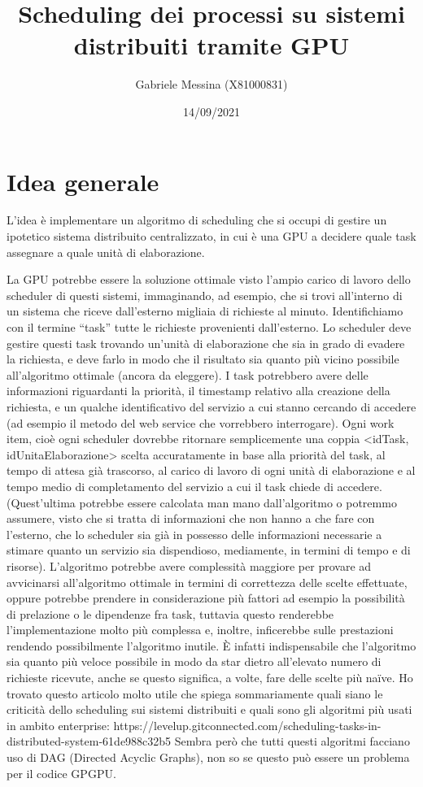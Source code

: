 \documentclass{article}
\title{Scheduling dei processi su sistemi distribuiti tramite GPU}
\author{Gabriele Messina (X81000831)}
\date{14/09/2021}
\begin{document}
    \maketitle

    \section{Idea generale}
        L'idea è implementare un algoritmo di scheduling che si occupi di gestire un ipotetico sistema distribuito centralizzato, in cui è una GPU a decidere quale task assegnare a quale unità di elaborazione.

        La GPU potrebbe essere la soluzione ottimale visto l'ampio carico di lavoro dello scheduler di questi sistemi, immaginando, ad esempio, che si trovi all'interno di un sistema che riceve dall'esterno migliaia di richieste al minuto.
        Identifichiamo con il termine “task” tutte le richieste provenienti dall'esterno.
        Lo scheduler deve gestire questi task trovando un'unità di elaborazione che sia in grado di evadere la richiesta, e deve farlo in modo che il risultato sia quanto più vicino possibile all'algoritmo ottimale (ancora da eleggere).
        I task potrebbero avere delle informazioni riguardanti la priorità, il timestamp relativo alla creazione della richiesta, e un qualche identificativo del servizio a cui stanno cercando di accedere (ad esempio il metodo del web service che vorrebbero interrogare).
        Ogni work item, cioè ogni scheduler dovrebbe ritornare semplicemente una coppia <idTask, idUnitaElaborazione> scelta accuratamente in base alla priorità del task, al tempo di attesa già trascorso, al carico di lavoro di ogni unità di elaborazione e al tempo medio di completamento del servizio a cui il task chiede di accedere. (Quest'ultima potrebbe essere calcolata man mano dall'algoritmo o potremmo assumere, visto che si tratta di informazioni che non hanno a che fare con l'esterno, che lo scheduler sia già in possesso delle informazioni necessarie a stimare quanto un servizio sia dispendioso, mediamente, in termini di tempo e di risorse).
        L'algoritmo potrebbe avere complessità maggiore per provare ad avvicinarsi all'algoritmo ottimale in termini di correttezza delle scelte effettuate, oppure potrebbe prendere in considerazione più fattori ad esempio la possibilità di prelazione o le dipendenze fra task, tuttavia questo renderebbe l'implementazione molto più complessa e, inoltre, inficerebbe sulle prestazioni rendendo possibilmente l'algoritmo inutile. È infatti indispensabile che l'algoritmo sia quanto più veloce possibile in modo da star dietro all'elevato numero di richieste ricevute, anche se questo significa, a volte, fare delle scelte più naïve.
        Ho trovato questo articolo molto utile che spiega sommariamente quali siano le criticità dello scheduling sui sistemi distribuiti e quali sono gli algoritmi più usati in ambito enterprise: https://levelup.gitconnected.com/scheduling-tasks-in-distributed-system-61de988c32b5
        Sembra però che tutti questi algoritmi facciano uso di DAG (Directed Acyclic Graphs), non so se questo può essere un problema per il codice GPGPU.
\end{document}
